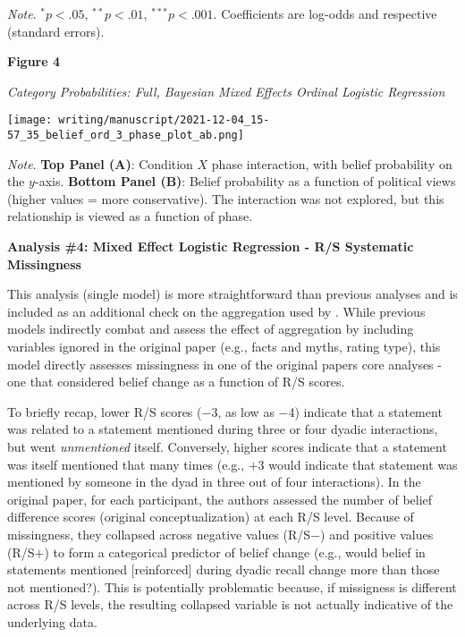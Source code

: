 \documentclass[12pt]{article}  %
\begin{document}
\singlespacing
\textit{Note}. $^{*}p < .05$, $^{**}p < .01$, $^{***}p < .001$. Coefficients are log-odds and respective (standard errors).

\newpage


\doublespacing


\newpage

\textbf{Figure 4}

\textit{Category Probabilities: Full, Bayesian Mixed Effects Ordinal Logistic Regression}

\vspace{0.5cm}

\hspace{-1.5cm}\texttt{[image: writing/manuscript/2021-12-04\_15-57\_35\_belief\_ord\_3\_phase\_plot\_ab.png]}

\singlespacing
\noindent\textit{Note}. \textbf{Top Panel (A)}: Condition $X$ phase interaction, with belief probability on the $y$-axis. \textbf{Bottom Panel (B)}: Belief probability as a function of political views (higher values = more conservative). The interaction was not explored, but this relationship is viewed as a function of phase.

\newpage


\doublespacing

\noindent\textbf{Analysis \#4: Mixed Effect Logistic Regression - R/S Systematic Missingness}

This analysis (single model) is more straightforward than previous analyses and is included as an additional check on the aggregation used by \textcite{vlasceanu_synchronization_2020}. While previous models indirectly combat and assess the effect of aggregation by including variables ignored in the original paper (e.g., facts and myths, rating type), this model directly assesses missingness in one of the original papers core analyses - one that considered belief change as a function of R/S scores.

To briefly recap, lower R/S scores ($-$3, as low as $-$4) indicate that a statement was related to a statement mentioned during three or four dyadic interactions, but went \textit{unmentioned} itself. Conversely, higher scores indicate that a statement was itself mentioned that many times (e.g., $+$3 would indicate that statement was mentioned by someone in the dyad in three out of four interactions). In the original paper, for each participant, the authors assessed the number of belief difference scores (original conceptualization) at each R/S level. Because of missingness, they collapsed across negative values (R/S$-$) and positive values (R/S$+$) to form a categorical predictor of belief change (e.g., would belief in statements mentioned [reinforced] during dyadic recall change more than those not mentioned?). This is potentially problematic because, if missigness is different across R/S levels, the resulting collapsed variable is not actually indicative of the underlying data.
\end{document}
